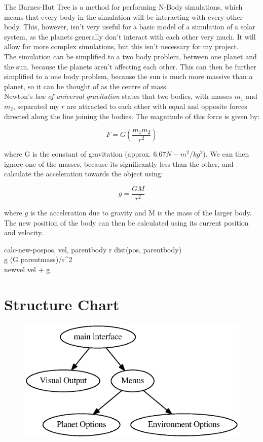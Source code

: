 The Barnes-Hut Tree is a method for performing N-Body simulations, which means
that every body in the simulation will be interacting with every other body.
This, however, isn't very useful for a basic model of a simulation of a solar
system, as the planets generally don't interact with each other very much. It
will allow for more complex simulations, but this isn't necessary for my
project. \\

The simulation can be simplified to a two body problem, between one planet and
the sun, because the planets aren't affecting each other. This can then be
further simplified to a one body problem, because the sun is much more massive
than a planet, so it can be thought of as the centre of mass. \\

Newton's \emph{law of universal gravitation} states that two bodies, with masses
$m_1$ and $m_2$, separated my $r$ are attracted to each other with equal and
opposite forces directed along the line joining the bodies. The magnitude of
this force is given by:

\begin{equation}
	F = G (\frac{m_1 m_2}{r^2})	
\end{equation}

where G is the constant of gravitation (approx. $6.67 N-m^2/kg^2$). We can then
ignore one of the masses, because its significantly less than the other, and
calculate the acceleration towards the object using:

\begin{equation}
	g = \frac{GM}{r^2}
\end{equation}

where $g$ is the acceleration due to gravity and M is the mass of the larger
body. The new position of the body can then be calculated using its current
position and velocity.

\begin{pseudocode}{calc-new-pos}{pos, vel, parentbody}
	r \GETS dist(pos, parentbody)	 \\
	g \GETS (G \cdot parentmass)/r^2 \\
	newvel \GETS vel + g \\
\end{pseudocode}

\section{Structure Chart}
\begin{figure}[h]
	\includegraphics[width=\textwidth]{./img/hier.eps}
\end{figure}

